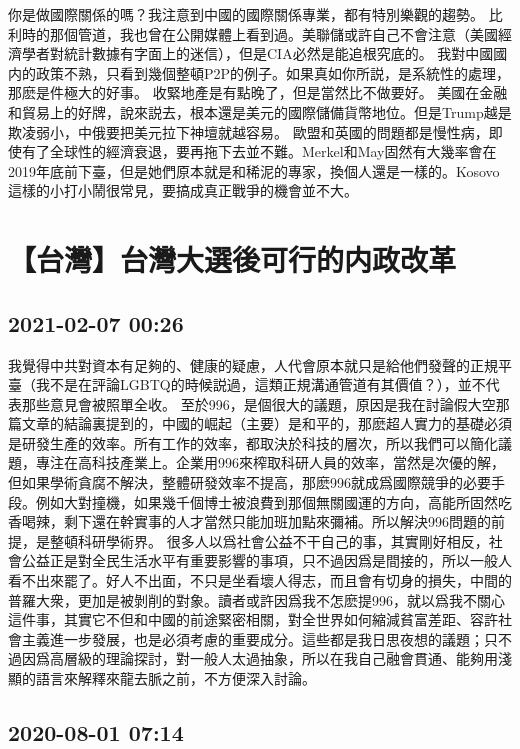 \documentclass[twocolumn]{ctexart}
\begin{document}
你是做國際關係的嗎？我注意到中國的國際關係專業，都有特別樂觀的趨勢。
比利時的那個管道，我也曾在公開媒體上看到過。美聯儲或許自己不會注意（美國經濟學者對統計數據有字面上的迷信），但是CIA必然是能追根究底的。
我對中國國内的政策不熟，只看到幾個整頓P2P的例子。如果真如你所説，是系統性的處理，那麽是件極大的好事。
收緊地產是有點晚了，但是當然比不做要好。
美國在金融和貿易上的好牌，說來説去，根本還是美元的國際儲備貨幣地位。但是Trump越是欺凌弱小，中俄要把美元拉下神壇就越容易。
歐盟和英國的問題都是慢性病，即使有了全球性的經濟衰退，要再拖下去並不難。Merkel和May固然有大幾率會在2019年底前下臺，但是她們原本就是和稀泥的專家，換個人還是一樣的。Kosovo這樣的小打小鬧很常見，要搞成真正戰爭的機會並不大。
\section*{【台灣】台灣大選後可行的内政改革}
\subsection*{2021-02-07 00:26}

我覺得中共對資本有足夠的、健康的疑慮，人代會原本就只是給他們發聲的正規平臺（我不是在評論LGBTQ的時候説過，這類正規溝通管道有其價值？），並不代表那些意見會被照單全收。
至於996，是個很大的議題，原因是我在討論假大空那篇文章的結論裏提到的，中國的崛起（主要）是和平的，那麽超人實力的基礎必須是研發生產的效率。所有工作的效率，都取決於科技的層次，所以我們可以簡化議題，專注在高科技產業上。企業用996來榨取科研人員的效率，當然是次優的解，但如果學術貪腐不解決，整體研發效率不提高，那麽996就成爲國際競爭的必要手段。例如大對撞機，如果幾千個博士被浪費到那個無關國運的方向，高能所固然吃香喝辣，剩下還在幹實事的人才當然只能加班加點來彌補。所以解決996問題的前提，是整頓科研學術界。
很多人以爲社會公益不干自己的事，其實剛好相反，社會公益正是對全民生活水平有重要影響的事項，只不過因爲是間接的，所以一般人看不出來罷了。好人不出面，不只是坐看壞人得志，而且會有切身的損失，中間的普羅大衆，更加是被剝削的對象。讀者或許因爲我不怎麽提996，就以爲我不關心這件事，其實它不但和中國的前途緊密相關，對全世界如何縮減貧富差距、容許社會主義進一步發展，也是必須考慮的重要成分。這些都是我日思夜想的議題；只不過因爲高層級的理論探討，對一般人太過抽象，所以在我自己融會貫通、能夠用淺顯的語言來解釋來龍去脈之前，不方便深入討論。
\subsection*{2020-08-01 07:14}
\end{document}
